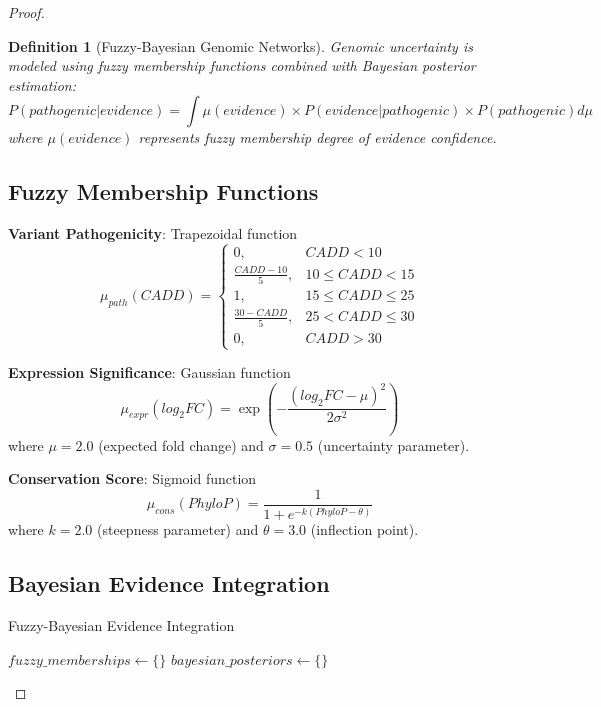 \documentclass[12pt,a4paper]{article}
\newtheorem{definition}[theorem]{Definition}
\begin{document}
\begin{proof}
\begin{definition}[Fuzzy-Bayesian Genomic Networks]
Genomic uncertainty is modeled using fuzzy membership functions combined with Bayesian posterior estimation:
\begin{equation}
P(pathogenic|evidence) = \int \mu(evidence) \times P(evidence|pathogenic) \times P(pathogenic) d\mu
\end{equation}
where $\mu(evidence)$ represents fuzzy membership degree of evidence confidence.
\end{definition}

\subsection{Fuzzy Membership Functions}

\textbf{Variant Pathogenicity}: Trapezoidal function
\begin{equation}
\mu_{path}(CADD) = \begin{cases}
0, & CADD < 10 \\
\frac{CADD - 10}{5}, & 10 \leq CADD < 15 \\
1, & 15 \leq CADD \leq 25 \\
\frac{30 - CADD}{5}, & 25 < CADD \leq 30 \\
0, & CADD > 30
\end{cases}
\end{equation}

\textbf{Expression Significance}: Gaussian function
\begin{equation}
\mu_{expr}(log_2FC) = \exp\left(-\frac{(log_2FC - \mu)^2}{2\sigma^2}\right)
\end{equation}
where $\mu = 2.0$ (expected fold change) and $\sigma = 0.5$ (uncertainty parameter).

\textbf{Conservation Score}: Sigmoid function
\begin{equation}
\mu_{cons}(PhyloP) = \frac{1}{1 + e^{-k(PhyloP - \theta)}}
\end{equation}
where $k = 2.0$ (steepness parameter) and $\theta = 3.0$ (inflection point).

\subsection{Bayesian Evidence Integration}

\begin{algorithm}
\caption{Fuzzy-Bayesian Evidence Integration}
\begin{algorithmic}
    \State $fuzzy\_memberships \gets \{\}$
    \State $bayesian\_posteriors \gets \{\}$
    

\end{algorithmic}
\end{algorithm}
\end{proof}
\end{document}
